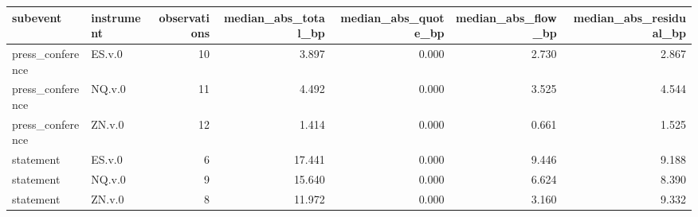\begin{tabular}{llrrrrr}
\toprule
subevent & instrument & observations & median_abs_total_bp & median_abs_quote_bp & median_abs_flow_bp & median_abs_residual_bp \\
\midrule
press_conference & ES.v.0 & 10 & 3.897 & 0.000 & 2.730 & 2.867 \\
press_conference & NQ.v.0 & 11 & 4.492 & 0.000 & 3.525 & 4.544 \\
press_conference & ZN.v.0 & 12 & 1.414 & 0.000 & 0.661 & 1.525 \\
statement & ES.v.0 & 6 & 17.441 & 0.000 & 9.446 & 9.188 \\
statement & NQ.v.0 & 9 & 15.640 & 0.000 & 6.624 & 8.390 \\
statement & ZN.v.0 & 8 & 11.972 & 0.000 & 3.160 & 9.332 \\
\bottomrule
\end{tabular}
